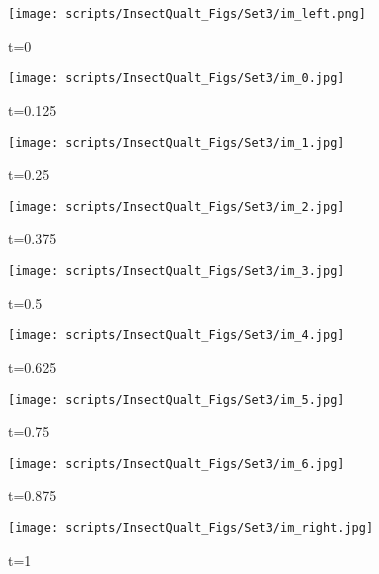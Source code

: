 \documentclass[10pt,twocolumn,letterpaper]{article}
\begin{document}
\begin{figure*}[t]
\begin{center}
    \begin{subfigure}[b]{0.1\textwidth}
        \centering
        \texttt{[image: scripts/InsectQualt\_Figs/Set3/im\_left.png]}
        \captionsetup{width=\textwidth}
        \caption{t=0}
    \end{subfigure}
    \hfill
    \begin{subfigure}[b]{0.1\textwidth}
        \centering
        \texttt{[image: scripts/InsectQualt\_Figs/Set3/im\_0.jpg]}
        \captionsetup{width=\textwidth}
        \caption{t=0.125}
    \end{subfigure}
    \hfill
    \begin{subfigure}[b]{0.1\textwidth}
        \centering
        \texttt{[image: scripts/InsectQualt\_Figs/Set3/im\_1.jpg]}
        \captionsetup{width=\textwidth}
        \caption{t=0.25}
    \end{subfigure}
    \hfill
    \begin{subfigure}[b]{0.1\textwidth}
        \centering
        \texttt{[image: scripts/InsectQualt\_Figs/Set3/im\_2.jpg]}
        \captionsetup{width=\textwidth}
        \caption{t=0.375}
    \end{subfigure}
    \hfill
    \begin{subfigure}[b]{0.1\textwidth}
        \centering
        \texttt{[image: scripts/InsectQualt\_Figs/Set3/im\_3.jpg]}
        \captionsetup{width=\textwidth}
        \caption{t=0.5}
    \end{subfigure}
    \hfill
    \begin{subfigure}[b]{0.1\textwidth}
        \centering
        \texttt{[image: scripts/InsectQualt\_Figs/Set3/im\_4.jpg]}
        \captionsetup{width=\textwidth}
        \caption{t=0.625}
    \end{subfigure}
    \hfill
    \begin{subfigure}[b]{0.1\textwidth}
        \centering
        \texttt{[image: scripts/InsectQualt\_Figs/Set3/im\_5.jpg]}
        \captionsetup{width=\textwidth}
        \caption{t=0.75}
    \end{subfigure}
    \hfill
    \begin{subfigure}[b]{0.1\textwidth}
        \centering
        \texttt{[image: scripts/InsectQualt\_Figs/Set3/im\_6.jpg]}
        \captionsetup{width=\textwidth}
        \caption{t=0.875}
    \end{subfigure}
    \hfill
    \begin{subfigure}[b]{0.1\textwidth}
        \centering
        \texttt{[image: scripts/InsectQualt\_Figs/Set3/im\_right.jpg]}
        \captionsetup{width=\textwidth}
        \caption{t=1}
    \end{subfigure}
    



\end{center}
\end{figure*}
\end{document}

